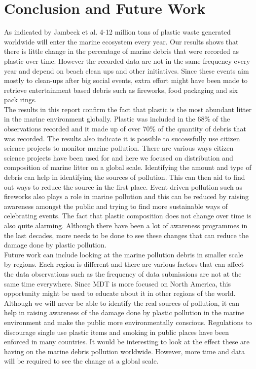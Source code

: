 \documentclass[10pt]{article}\usepackage[]{graphicx}\usepackage[]{color}
\begin{document}
\pagebreak
\section{Conclusion and Future Work}

As indicated by Jambeck et al.\cite{JAMBECK2015} 4-12 million tons of plastic waste generated worldwide will enter the marine ecosystem every year. Our results shows that there is little change in the percentage of marine debris that were recorded as plastic over time. However the recorded data are not in the same frequency every year and depend on beach clean ups and other initiatives. Since these events aim mostly to clean-ups after big social events, extra effort might have been made to retrieve entertainment based debris such as fireworks, food packaging and six pack rings. \\

The results in this report confirm the fact that plastic is the most abundant litter in the marine environment globally. Plastic was included in the 68\% of the observations recorded and it made up of over 70\% of the quantity of debris that was recorded. The results also indicate it is possible to successfully use citizen science projects to monitor marine pollution. There are various ways citizen science projects have been used for and here we focused on distribution and composition of marine litter on a global scale. Identifying the amount and type of debris can help in identifying the sources of pollution. This can then aid to find out ways to reduce the source in the first place. Event driven pollution such as fireworks also plays a role in marine pollution and this can be reduced by raising awareness amongst the public and trying to find more sustainable ways of celebrating events. The fact that plastic composition does not change over time is also quite alarming. Although there have been a lot of awareness programmes in the last decades, more needs to be done to see these changes that can reduce the damage done by plastic pollution.  \\

Future work can include looking at the marine pollution debris in smaller scale by regions. Each region is different and there are various factors that can affect the data observations such as the frequency of data submissions are not at the same time everywhere.  Since MDT is more focused on North America, this opportunity might be used to educate about it in other regions of the world. Although we will never be able to identify the real sources of pollution, it can help in raising awareness of the damage done by plastic pollution in the marine environment and make the public more environmentally conscious. Regulations to discourage single use plastic items and smoking in public places have been enforced in many countries. It would be interesting to look at the effect these are having on the marine debris pollution worldwide. However, more time and data will be required to see the change at a global scale. \\
\end{document}
